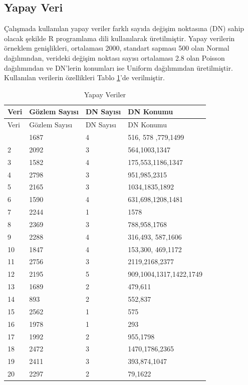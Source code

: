 \documentclass[12pt,twoside]{deuthesis}
\begin{document}
\hypertarget{yapay-veri}{%
\subsection{Yapay Veri}\label{yapay-veri}}

Çalışmada kullanılan yapay veriler farklı sayıda değişim noktasına (DN) sahip olacak şekilde R programlama dili kullanılarak üretilmiştir. Yapay verilerin örneklem genişlikleri, ortalaması 2000, standart sapması 500 olan Normal dağılımndan, verideki değişim noktası sayısı ortalaması 2.8 olan Poisson dağılımından ve DN'lerin konumları ise Uniform dağılımından üretilmiştir. Kullanılan verilerin özellikleri Tablo \ref{tab:nvar1}'de verilmiştir.

\begin{longtable}[]{@{}llll@{}}
\caption{\label{tab:nvar1} Yapay Veriler}\tabularnewline
\toprule\noalign{}
Veri & Gözlem Sayısı & DN Sayısı & DN Konumu \\
\midrule\noalign{}
\endfirsthead
\toprule\noalign{}
Veri & Gözlem Sayısı & DN Sayısı & DN Konumu \\
\midrule\noalign{}
\endhead
\bottomrule\noalign{}
\endlastfoot
1 & 1687 & 4 & 516, 578 ,779,1499 \\
2 & 2092 & 3 & 564,1003,1347 \\
3 & 1582 & 4 & 175,553,1186,1347 \\
4 & 2798 & 3 & 951,985,2315 \\
5 & 2165 & 3 & 1034,1835,1892 \\
6 & 1590 & 4 & 631,698,1208,1481 \\
7 & 2244 & 1 & 1578 \\
8 & 2369 & 3 & 788,958,1768 \\
9 & 2288 & 4 & 316,493, 587,1606 \\
10 & 1847 & 4 & 153,300, 469,1172 \\
11 & 2756 & 3 & 2119,2168,2377 \\
12 & 2195 & 5 & 909,1004,1317,1422,1749 \\
13 & 1689 & 2 & 479,611 \\
14 & 893 & 2 & 552,837 \\
15 & 2562 & 1 & 575 \\
16 & 1978 & 1 & 293 \\
17 & 1992 & 2 & 955,1798 \\
18 & 2472 & 3 & 1470,1786,2365 \\
19 & 2411 & 3 & 393,874,1047 \\
20 & 2297 & 2 & 79,1622 \\
\end{longtable}
\end{document}
